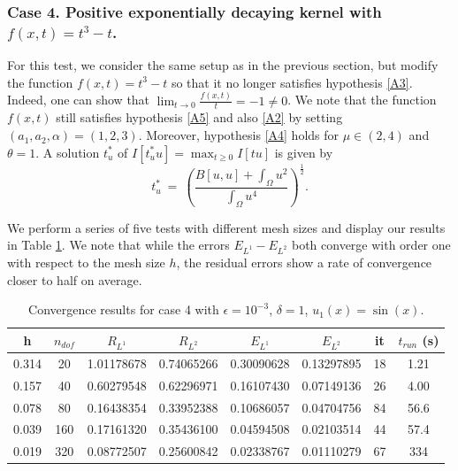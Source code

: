 \documentclass[11pt]{amsart}   	%
\theoremstyle{plain}
\numberwithin{equation}{section}
\begin{document}
\subsubsection{Case 4. Positive exponentially decaying kernel with $f(x,t)=t^3-t$.}\label{sec:num_case_4}
For this test, we consider the same setup as in the previous section, but modify the function $f(x,t)=t^3-t$ so that it no longer satisfies hypothesis \ref{A3}. Indeed, one can show that $\lim_{t \rightarrow 0}\frac{f(x, t)}{t} = -1 \neq 0$. 
We note that the function $f(x,t)$ still satisfies hypothesis \ref{A5} and also \ref{A2} by setting $(a_1,a_2,\alpha)=(1,2,3)$. Moreover, hypothesis \ref{A4} holds for $\mu\in(2,4)$ and $\theta=1$. 
A solution $t^*_u$ of $I[t^*_u u]  = \max_{t\geq 0} I[tu]$ is given by
$$t^*_u \ = \ \left( \frac{B[u,u] + \int_\Omega u^2}{\int_\Omega u^4} \right)^{\frac{1}{2}}.$$

We perform a series of five tests with different mesh sizes and display our results in Table \ref{tab:num_case_4}. We note that while the errors $E_{L^1}-E_{L^2}$ both converge with order one with respect to the mesh size $h$, the residual errors show a rate of convergence closer to half on average.
\begin{table}[H]
    \centering
    \caption{Convergence results for case 4 with $\epsilon=10^{-3}$, $\delta=1$, $u_1(x)=\sin(x)$.}%
    \begin{tabular}{|c|c||c|c||c|c||c|c|}
    \hline
    h & $n_{dof}$ & $R_{L^1}$ & $R_{L^2} $  & $E_{L^1}$ & $E_{L^2}$ & it & $t_{run}$ (s)
    \\ \hline
    0.314 & 20 &1.01178678 & 0.74065266 & 0.30090628 & 0.13297895 & 18 & 1.21
    \\ \hline
    0.157 & 40 & 0.60279548 & 0.62296971 & 0.16107430 & 0.07149136 & 26 &  4.00
    \\ \hline
    0.078 & 80 & 0.16438354 & 0.33952388 &0.10686057 &0.04704756 & 84 & 56.6
    \\ \hline
    0.039 & 160 & 0.17161320 & 0.35436100 &0.04594508 & 0.02103514& 44 & 57.4     
    \\ \hline
    0.019 & 320 & 0.08772507 & 0.25600842 &0.02338767 & 0.01110279& 67 & 334 
    \\ \hline  
    \end{tabular}
    \label{tab:num_case_4}
\end{table}
\end{document}
